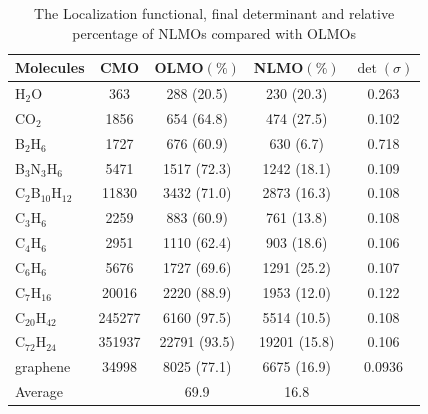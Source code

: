 \documentclass[aps,prl,reprint,amsmath,amssymb]{revtex4-1}
\begin{document}
\begin{table}[ht]
\caption{The Localization functional, final determinant and relative percentage of NLMOs compared with OLMOs}
\label{tab:loc}
\centering
\begin{tabular}{l c c c c}
\hline\hline
Molecules & CMO &  OLMO$(\%)$ & NLMO$(\%)$ & $\det(\sigma)$ \\
\hline
H$_2$O & 363 & 288 (20.5) & 230 (20.3) & 0.263 \\ 
CO$_2$ & 1856 & 654 (64.8) & 474 (27.5) & 0.102 \\
B$_2$H$_6$ & 1727 & 676 (60.9) & 630 (6.7) & 0.718 \\
B$_3$N$_3$H$_6$ & 5471 & 1517 (72.3)  & 1242 (18.1) & 0.109  \\
C$_2$B$_{10}$H$_{12}$ & 11830 & 3432 (71.0) & 2873 (16.3) & 0.108 \\ 
C$_3$H$_6$ & 2259 & 883 (60.9) & 761 (13.8) & 0.108 \\
C$_4$H$_6$ & 2951 & 1110 (62.4) & 903 (18.6) & 0.106 \\
C$_6$H$_6$  & 5676 & 1727 (69.6) & 1291 (25.2) & 0.107 \\ 
C$_7$H$_{16}$ & 20016 & 2220 (88.9) & 1953 (12.0) & 0.122 \\ 
C$_{20}$H$_{42}$ & 245277 & 6160 (97.5) & 5514 (10.5) & 0.108 \\ 
C$_{72}$H$_{24}$ & 351937 & 22791 (93.5) & 19201 (15.8) & 0.106 \\ 
graphene & 34998 & 8025 (77.1) & 6675 (16.9) & 0.0936 \\
Average & & 69.9 & 16.8 & \\
\hline
\end{tabular}
\label{table:nonlin}
\end{table}
\end{document}
